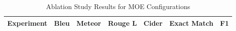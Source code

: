 \begin{table}[h]
\centering
\caption{Ablation Study Results for MOE Configurations}
\label{tab:ablation}
\begin{tabular}{lcccccc}
\toprule
Experiment & Bleu & Meteor & Rouge L & Cider & Exact Match & F1 \\
\midrule
\bottomrule
\end{tabular}
\end{table}